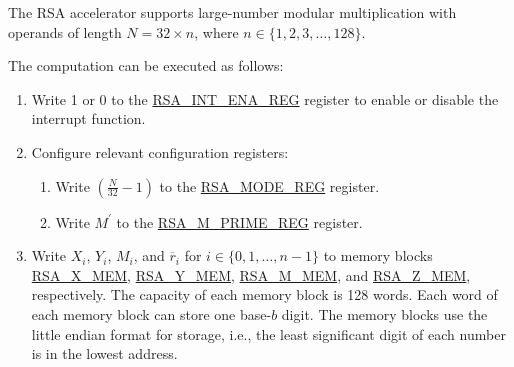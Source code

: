 \documentclass[main\_\_EN.tex]{subfiles}
\begin{document}
The RSA accelerator supports large-number modular multiplication with operands of length \begin{math}N = 32 \times n\end{math}, where \begin{math}n \in \{ 1,2,3, \dots, 128\} \end{math}.

The computation can be executed as follows:

\begin{enumerate}

    \item Write 1 or 0 to the \hyperref[regdesc:RSAINTENAREG]{RSA\_INT\_ENA\_REG} register to enable or disable the interrupt function.

    \item Configure relevant configuration registers:

    \begin{enumerate}
        \item Write \begin{math}( \frac{N}{32} - 1 )\end{math} to the \hyperref[regdesc:RSAMODEREG]{RSA\_MODE\_REG} register.

        \item Write \begin{math}M^{\prime}\end{math} to the \hyperref[regdesc:RSAMPRIMEREG]{RSA\_M\_PRIME\_REG} register.

    \end{enumerate}

    \item Write
        \begin{math}X_{i}\end{math},
        \begin{math}Y_{i}\end{math},
        \begin{math}M_{i}\end{math}, and
        \begin{math}\overline{r}_{i}\end{math} for \begin{math}i \in \{ 0, 1, \dots, n-1 \} \end{math} to memory blocks \hyperref[regdesc:RSAmemory]{RSA\_X\_MEM}, \hyperref[regdesc:RSAmemory]{RSA\_Y\_MEM}, \hyperref[regdesc:RSAmemory]{RSA\_M\_MEM}, and \hyperref[regdesc:RSAmemory]{RSA\_Z\_MEM}, respectively. The capacity of each memory block is 128 words. Each word of each memory block can store one base-\begin{math}b\end{math} digit. The memory blocks use the little endian format for storage, i.e., the least significant digit of each number is in the lowest address.


\end{enumerate}
\end{document}
